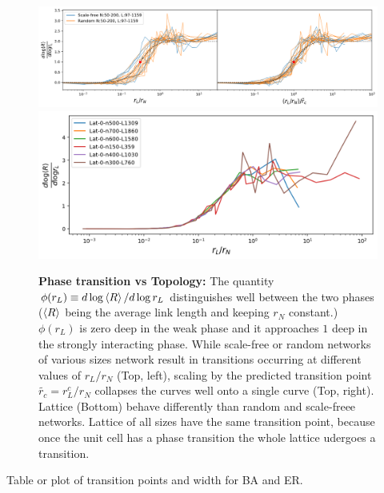 \documentclass[11pt]{article}
\begin{document}
\begin{response}
\begin{figure}
    \centering
    \includegraphics[width=\textwidth]{fig-09-19/phase-collapse-040918.png}
    \includegraphics[width=.6\textwidth]{fig-09-19/phase-lat-040918.png}
    \caption{{\bf Phase transition vs Topology:} The quantity $\phi(r_L)\equiv d\log\left<R\right> /d\log r_L$ distinguishes well between the two phases  ($\left<R\right>$ being the average link length and keeping $r_N$ constant.)
    $\phi (r_L) $ is zero deep in the weak phase and it approaches $1$ deep in the strongly interacting phase. 
    While scale-free or random networks of various sizes network result in transitions occurring at different values of $r_L/r_N$ (Top, left), scaling by the predicted transition point $\tilde{r_c}=r^c_L/r_N$ collapses the curves well onto a single curve (Top, right).
    Lattice (Bottom) behave differently than random and scale-freee networks. 
    Lattice of all sizes have the same transition point, because once the unit cell has a phase transition the whole lattice udergoes a transition. 
    }
    \label{fig:phase-collapse}
\end{figure}

{\color{red} Table or plot of transition points and width for BA and ER. }


\end{response}
\end{document}
